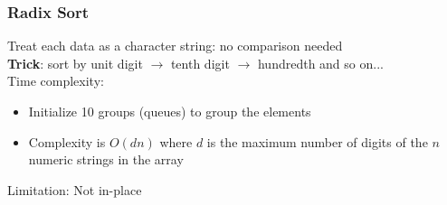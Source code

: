 \documentclass{article}
\begin{document}
\begin{multicols}{2}
\subsubsection{Radix Sort}
Treat each data as a character string: no comparison needed\\
\textbf{Trick}: sort by unit digit $\rightarrow$ tenth digit $\rightarrow$ hundredth and so on...\\
Time complexity:
\begin{itemize}
	\item Initialize 10 groups (queues) to group the elements
	\item Complexity is $O(dn)$ where $d$ is the maximum number of digits of the $n$ numeric strings in the array
\end{itemize}
Limitation: Not in-place


\end{multicols}
\end{document}
